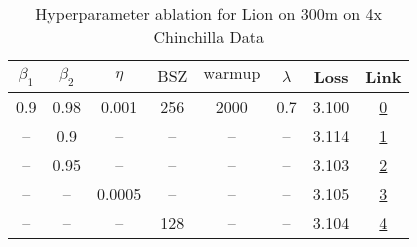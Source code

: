 \begin{table}[H]
\centering
\caption{Hyperparameter ablation for Lion on 300m on 4x Chinchilla Data}
\label{tab:ablation_lion_300m_4}
\begin{tabular}{cccccccc}
\toprule
$\beta_1$ & $\beta_2$ & $\eta$ & $\mathrm{BSZ}$ & $\mathrm{warmup}$ & $\lambda$ & Loss & Link \\
\midrule
0.9 & 0.98 & 0.001 & 256 & 2000 & 0.7 & 3.100 & \href{https://wandb.ai/stanford-mercury/optimizer-scaling/runs/sweep-300m-24B-lion5aad2alr0.001-wd0.7-minlr0-warmup2000-b10.9-b-edb7fa}{0} \\
\midrule
-- & 0.9 & -- & -- & -- & -- & 3.114 & \href{https://wandb.ai/stanford-mercury/optimizer-scaling/runs/sweep-300m-24B-lionb554b6lr0.001-wd0.7-minlr0-warmup2000-b10.9-b-4d69db}{1} \\
-- & 0.95 & -- & -- & -- & -- & 3.103 & \href{https://wandb.ai/stanford-mercury/optimizer-scaling/runs/sweep-300m-24B-lion1d519dlr0.001-wd0.7-minlr0-warmup2000-b10.9-b-a24dd3}{2} \\
-- & -- & 0.0005 & -- & -- & -- & 3.105 & \href{https://wandb.ai/stanford-mercury/optimizer-scaling/runs/sweep-300m-24B-liond0e427lr0.0005-wd0.7-minlr0-warmup2000-b10.9--ab64aa}{3} \\
-- & -- & -- & 128 & -- & -- & 3.104 & \href{https://wandb.ai/stanford-mercury/optimizer-scaling/runs/sweep-300m-24B-lioneb1a25lr0.001-wd0.7-minlr0-warmup2000-b10.9-b-8b79ae}{4} \\
\bottomrule
\end{tabular}
\end{table}

